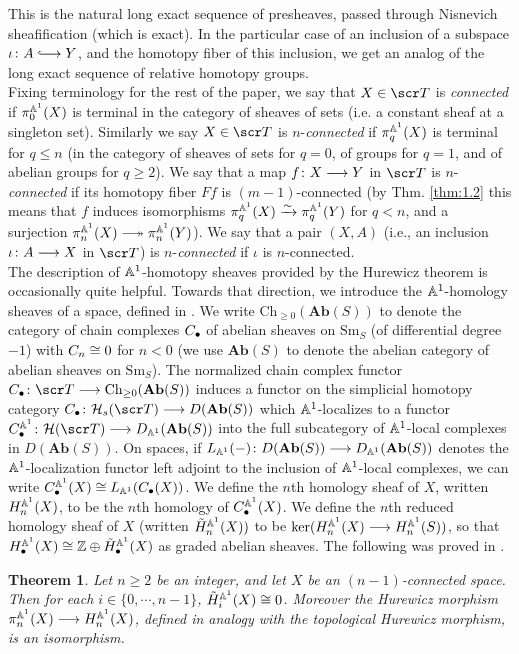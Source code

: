 \documentclass{amsart}
\newtheorem{thm}{Theorem}[section]
\theoremstyle{definition}
\begin{document}
\noindent This is the natural long exact sequence of presheaves, passed through Nisnevich sheafification (which is exact). In the particular case of an inclusion of a subspace $\iota \colon A \monoto Y$, and the homotopy fiber of this inclusion, we get an analog of the long exact sequence of relative homotopy groups.\\

Fixing terminology for the rest of the paper, we say that $X \in \sT$ is \emph{connected} if $\pi_0^{\mathbb{A}^1}(X)$ is terminal in the category of sheaves of sets (i.e. a constant sheaf at a singleton set). Similarly we say $X \in \sT$ is $n$-\emph{connected} if $\pi_q^{\mathbb{A}^1}(X)$ is terminal for $q \leq n$ (in the category of sheaves of sets for $q=0$, of groups for $q=1$, and of abelian groups for $q \geq 2$). We say that a map $f \colon X \longrightarrow Y$ in $\sT$ is $n$-\emph{connected} if its homotopy fiber $Ff$ is $(m-1)$-connected (by Thm. \ref{thm:1.2} this means that $f$ induces isomorphisms $\pi_q^{\mathbb{A}^1}(X) \xrightarrow{\sim} \pi_q^{\mathbb{A}^1}(Y)$ for $q < n$, and a surjection $\pi_n^{\bA^1}(X) \epito \pi_n^{\bA^1}(Y)$). We say that a pair $(X,A)$ (i.e., an inclusion $\iota \colon A \longrightarrow X$ in $\sT$) is $n$-\emph{connected} if $\iota$ is $n$-connected.\\

The description of $\mathbb{A}^1$-homotopy sheaves provided by the Hurewicz theorem is occasionally quite helpful. Towards that direction, we introduce
the $\mathbb{A}^1$-homology sheaves of a space, defined in \cite{morel05stab}. We write $\mathrm{Ch}_{\geq 0}(\mathbf{Ab}(S))$ to denote the category of chain complexes $C_{\bullet}$ of abelian sheaves on $\mathrm{Sm}_S$ (of differential degree $-1$) with $C_n \cong 0$ for $n < 0$ (we use $\mathbf{Ab}(S)$ to denote the abelian category of abelian sheaves on $\mathrm{Sm}_S$). The normalized chain complex functor $C_{\bu} \colon \sT \rtarr \mathrm{Ch}_{\geq 0}(\mathbf{Ab}(S))$ induces a functor on the simplicial homotopy category $C_{\bu} \colon \oH_{s}(\sT) \rtarr D(\mathbf{Ab}(S))$ which $\mathbb{A}^1$-localizes to a functor $C^{\bA^1}_{\bu} \colon \oH(\sT) \rtarr D_{\bA^1}(\mathbf{Ab}(S))$ into the full subcategory of $\mathbb{A}^1$-local complexes in $D(\mathbf{Ab}(S))$. On spaces, if $L_{\mathbb{A}^1}(-) \colon D(\mathbf{Ab}(S)) \longrightarrow D_{\mathbb{A}^1}(\mathbf{Ab}(S))$ denotes the $\mathbb{A}^1$-localization functor left adjoint to the inclusion of $\mathbb{A}^1$-local complexes, we can write $C_{\bullet}^{\mathbb{A}^1}(X) \cong L_{\mathbb{A}^1}(C_{\bullet}(X))$. We define the $n$th homology sheaf of $X$, written $H^{\mathbb{A}^1}_{n}(X)$, to be the $n$th homology of $C^{\mathbb{A}^1}_{\bullet}(X)$. We define the $n$th reduced homology sheaf of $X$ (written $\tilde{H}^{\mathbb{A}^1}_{n}(X))$ to be $\ker(H^{\mathbb{A}^1}_{n}(X) \longrightarrow H^{\mathbb{A}^1}_n(S))$, so that $H^{\mathbb{A}^1}_{\bullet}(X) \cong \mathbb{Z} \oplus \tilde{H}^{\mathbb{A}^1}_{\bullet}(X)$ as graded abelian sheaves. The following was proved in \cite{morel12A1AT}.
\begin{thm}
Let $n \geq 2$ be an integer, and let $X$ be an $(n-1)$-connected space. Then for each $i \in \{0, \cdots, n-1\}$, $\tilde{H}^{\mathbb{A}^1}_i(X) \cong 0$. Moreover the Hurewicz morphism $\pi_n^{\mathbb{A}^1}(X) \longrightarrow H^{\mathbb{A}^1}_n(X)$, defined in analogy with the topological Hurewicz morphism, is an isomorphism. 
\end{thm}
\end{document}
